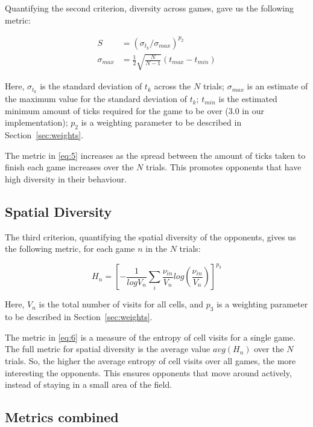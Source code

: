Quantifying the second criterion, diversity across games, gave us the following
metric:

\begin{subequations}
  \begin{align}
    \label{eq:5}
    S &= (\sigma_{t_k} / \sigma_{max})^{p_2}\\
    \sigma_{max} &= \frac{1}{2} \sqrt{\frac{N}{N-1}} (t_{max} - t_{min})
  \end{align}
\end{subequations}

Here, \(\sigma_{t_k}\) is the standard deviation of \(t_k\) across the \(N\)
trials; \(\sigma_{max}\) is an estimate of the maximum value for the standard
deviation of \(t_k\); \(t_{min}\) is the estimated minimum amount of ticks
required for the game to be over (3.0 in our implementation); \(p_2\) is a
weighting parameter to be described in Section~\ref{sec:weights}.

The metric in \eqref{eq:5} increases as the spread between the amount of ticks
taken to finish each game increases over the \(N\) trials. This promotes
opponents that have high diversity in their behaviour.

\subsection{Spatial Diversity}
\label{sec:spatial-diversity}

The third criterion, quantifying the spatial diversity of the opponents, gives
us the following metric, for each game \(n\) in the \(N\) trials:

\begin{equation}
  \label{eq:6}
  H_n = \left[ -\frac{1}{log V_n} \sum_i \frac{\nu_{in}}{V_n}
    log\left(\frac{\nu_{in}}{V_n}\right) \right]^{p_3}
\end{equation}

Here, \(V_n\) is the total number of visits for all cells, and \(p_3\) is a
weighting parameter to be described in Section~\ref{sec:weights}.

The metric in \eqref{eq:6} is a measure of the entropy of cell visits for a
single game. The full metric for spatial diversity is the average value
\(avg(H_n)\) over the \(N\) trials. So, the higher the average entropy of cell
visits over all games, the more interesting the opponents. This ensures
opponents that move around actively, instead of staying in a small area of the
field.

\subsection{Metrics combined}
\label{sec:metrics-combined}

